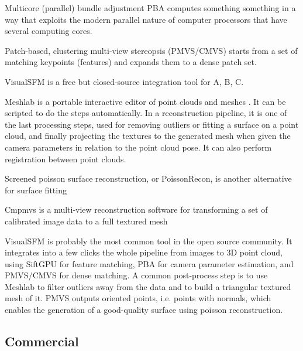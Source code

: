 Multicore (parallel) bundle adjustment PBA computes something something in a way that exploits the modern parallel nature of computer processors that have several computing cores. \cite{wu2011multicore}

Patch-based, clustering multi-view stereopsis (PMVS/CMVS) starts from a set of matching keypoints (features) and expands them to a dense patch set. \cite{furukawa2010accurate,furukawa2012patch}

VisualSFM \cite{wu2013towards} is a free but closed-source integration tool for A, B, C.

Meshlab is a portable interactive editor of point clouds and meshes \cite{meshlab}.
It can be scripted to do the steps automatically.
In a reconstruction pipeline, it is one of the last processing steps, used for removing outliers or fitting a surface on a point cloud, and finally projecting the textures to the generated mesh when given the camera parameters in relation to the point cloud pose.
It can also perform registration between point clouds.

Screened poisson surface reconstruction, or PoissonRecon, is another alternative for surface fitting \cite{kazhdan2013screened}

Cmpmvs is a multi-view reconstruction software for transforming a set of calibrated image data to a full textured mesh
\cite{jancosek2011multi}

VisualSFM is probably the most common tool in the open source community.
It integrates into a few clicks the whole pipeline from images to 3D point cloud, using SiftGPU for feature matching, PBA for camera parameter estimation, and PMVS/CMVS for dense matching.
A common post-process step is to use Meshlab to filter outliers away from the data and to build a triangular textured mesh of it. PMVS outputs oriented points, i.e. points with normals, which enables the generation of a good-quality surface using poisson reconstruction.


\subsection{Commercial}

